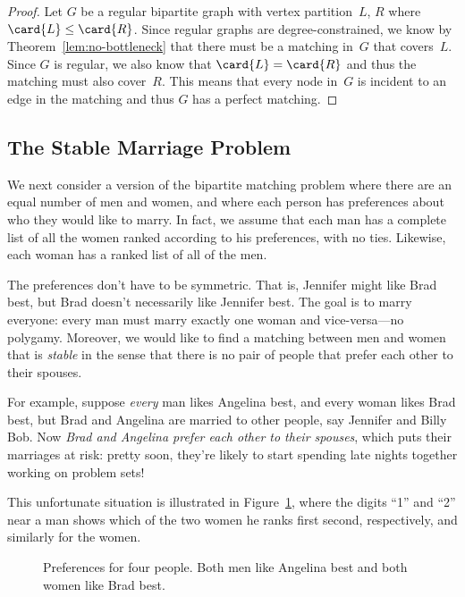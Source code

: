 \begin{proof}
Let $G$ be a regular bipartite graph with vertex partition~$L$, $R$
where $\card{L} \leq \card{R}$.  Since regular graphs are
degree-constrained, we know by Theorem~\ref{lem:no-bottleneck} that
there must be a matching in~$G$ that covers~$L$.  Since $G$ is
regular, we also know that $\card{L} = \card{R}$ and thus the matching
must also cover~$R$.  This means that every node in~$G$ is incident to
an edge in the matching and thus $G$ has a perfect matching.
\end{proof}

\subsection{The Stable Marriage Problem}
\label{stablemarriagesec}

We next consider a version of the bipartite matching problem where
there are an equal number of men and women, and where each person has
preferences about who they would like to marry.  In fact, we assume
that each man has a complete list of all the women ranked according
to his preferences, with no ties.  Likewise, each woman has a ranked
list of all of the men.

The preferences don't have to be symmetric.  That is, Jennifer might
like Brad best, but Brad doesn't necessarily like Jennifer best.  The
goal is to marry everyone: every man must marry exactly one woman and
vice-versa---no polygamy.  Moreover, we would like to find a matching
between men and women that is \emph{stable} in the sense that there is
no pair of people that prefer each other to their spouses.

For example, suppose \emph{every} man likes Angelina best, and every
woman likes Brad best, but Brad and Angelina are married to other
people, say Jennifer and Billy Bob.  Now \emph{Brad and Angelina
  prefer each other to their spouses}, which puts their marriages at
risk: pretty soon, they're likely to start spending late nights
together working on problem sets!

This unfortunate situation is illustrated in
Figure~\ref{fig:minWtMatch2}, where the digits ``1'' and ``2'' near a
man shows which of the two women he ranks first second, respectively,
and similarly for the women.

\begin{figure}


\caption{Preferences for four people.  Both men like Angelina best and
both women like Brad best.}
\label{fig:minWtMatch2}
\end{figure}

